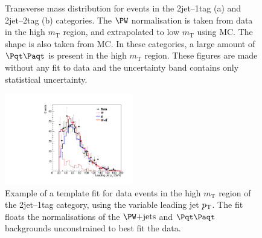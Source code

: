 \begin{figure}
\begin{center}

\end{center}
\caption[Transverse mass distribution for events in the 2jet--1tag (a) and
2jet--2tag (b) categories.]{
Transverse mass distribution for events in the 2jet--1tag (a) and
2jet--2tag (b) categories. The $\PW$ normalisation is taken from data in the high
$m_{\text{T}}$ region, and extrapolated to low $m_{\text{T}}$ using \ac{MC}. The
shape is also taken from \ac{MC}. In these categories, a large amount of
$\ttbar$ is present in the high $m_{\text{T}}$ region. These figures are made without any
fit to data and the uncertainty band contains only statistical uncertainty.}
\label{fig:2jet1tag2jet2tagmt}
\end{figure}


\begin{figure}
\begin{center}
    \includegraphics[width=0.5\textwidth]
      {plots/Hhh/W_TT_fit_prebjetpt_1_2jet1tag.pdf}

\end{center}
\caption[Example of a template fit for data events in the high $m_{\text{T}}$ region of the
2jet--1tag category, using the variable leading jet $\pt$.]{
Example of a template fit for data events in the high $m_{\text{T}}$ region of the
2jet--1tag category, using the variable leading jet $\pt$. The fit floats the
normalisations of the $\WJets$ and $\ttbar$ backgrounds unconstrained to best
fit the data.}
\label{fig:highmtfit}
\end{figure}

